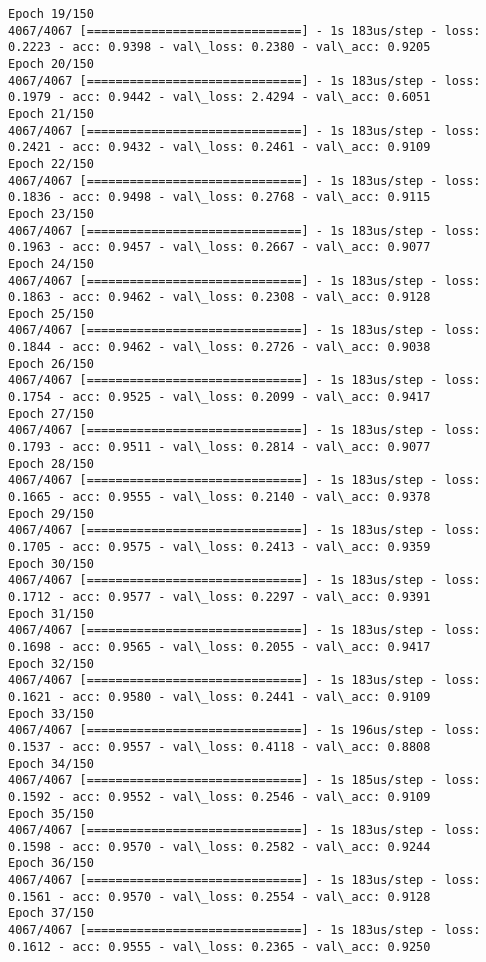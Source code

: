 \documentclass[11pt]{article}
\begin{document}
\begin{Verbatim}[commandchars=\\\{\}]
Epoch 19/150
4067/4067 [==============================] - 1s 183us/step - loss: 0.2223 - acc: 0.9398 - val\_loss: 0.2380 - val\_acc: 0.9205
Epoch 20/150
4067/4067 [==============================] - 1s 183us/step - loss: 0.1979 - acc: 0.9442 - val\_loss: 2.4294 - val\_acc: 0.6051
Epoch 21/150
4067/4067 [==============================] - 1s 183us/step - loss: 0.2421 - acc: 0.9432 - val\_loss: 0.2461 - val\_acc: 0.9109
Epoch 22/150
4067/4067 [==============================] - 1s 183us/step - loss: 0.1836 - acc: 0.9498 - val\_loss: 0.2768 - val\_acc: 0.9115
Epoch 23/150
4067/4067 [==============================] - 1s 183us/step - loss: 0.1963 - acc: 0.9457 - val\_loss: 0.2667 - val\_acc: 0.9077
Epoch 24/150
4067/4067 [==============================] - 1s 183us/step - loss: 0.1863 - acc: 0.9462 - val\_loss: 0.2308 - val\_acc: 0.9128
Epoch 25/150
4067/4067 [==============================] - 1s 183us/step - loss: 0.1844 - acc: 0.9462 - val\_loss: 0.2726 - val\_acc: 0.9038
Epoch 26/150
4067/4067 [==============================] - 1s 183us/step - loss: 0.1754 - acc: 0.9525 - val\_loss: 0.2099 - val\_acc: 0.9417
Epoch 27/150
4067/4067 [==============================] - 1s 183us/step - loss: 0.1793 - acc: 0.9511 - val\_loss: 0.2814 - val\_acc: 0.9077
Epoch 28/150
4067/4067 [==============================] - 1s 183us/step - loss: 0.1665 - acc: 0.9555 - val\_loss: 0.2140 - val\_acc: 0.9378
Epoch 29/150
4067/4067 [==============================] - 1s 183us/step - loss: 0.1705 - acc: 0.9575 - val\_loss: 0.2413 - val\_acc: 0.9359
Epoch 30/150
4067/4067 [==============================] - 1s 183us/step - loss: 0.1712 - acc: 0.9577 - val\_loss: 0.2297 - val\_acc: 0.9391
Epoch 31/150
4067/4067 [==============================] - 1s 183us/step - loss: 0.1698 - acc: 0.9565 - val\_loss: 0.2055 - val\_acc: 0.9417
Epoch 32/150
4067/4067 [==============================] - 1s 183us/step - loss: 0.1621 - acc: 0.9580 - val\_loss: 0.2441 - val\_acc: 0.9109
Epoch 33/150
4067/4067 [==============================] - 1s 196us/step - loss: 0.1537 - acc: 0.9557 - val\_loss: 0.4118 - val\_acc: 0.8808
Epoch 34/150
4067/4067 [==============================] - 1s 185us/step - loss: 0.1592 - acc: 0.9552 - val\_loss: 0.2546 - val\_acc: 0.9109
Epoch 35/150
4067/4067 [==============================] - 1s 183us/step - loss: 0.1598 - acc: 0.9570 - val\_loss: 0.2582 - val\_acc: 0.9244
Epoch 36/150
4067/4067 [==============================] - 1s 183us/step - loss: 0.1561 - acc: 0.9570 - val\_loss: 0.2554 - val\_acc: 0.9128
Epoch 37/150
4067/4067 [==============================] - 1s 183us/step - loss: 0.1612 - acc: 0.9555 - val\_loss: 0.2365 - val\_acc: 0.9250

\end{Verbatim}
\end{document}
